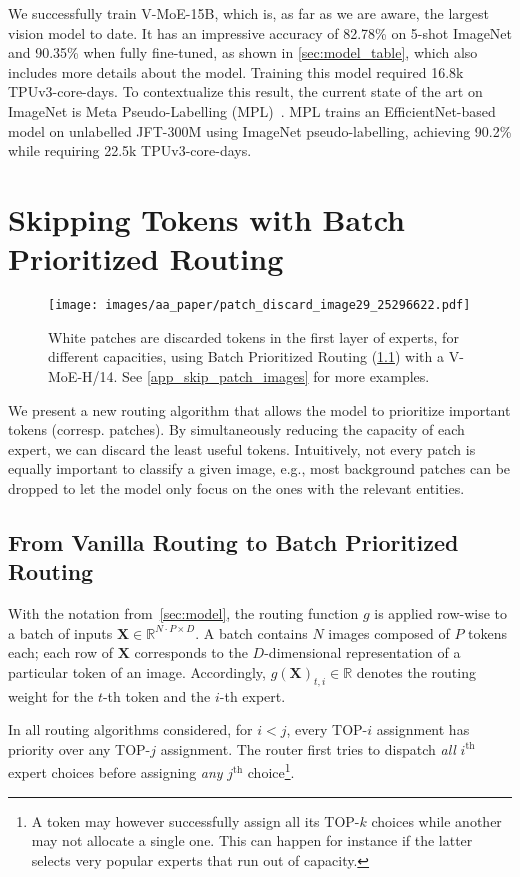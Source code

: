 \documentclass{article}
\newcommand{\abbv}{{V-MoE}}
\newcommand{\maxrouting}{Batch Prioritized Routing}
\begin{document}
We successfully train \abbv{}-15B, which is, as far as we are aware, the largest vision model to date. It has an impressive accuracy of 82.78\% on 5-shot ImageNet and 90.35\% when fully fine-tuned, as shown
in \cref{sec:model_table}, which also includes more details about the model.
Training this model required 16.8k TPUv3-core-days.
To contextualize this result, the current state of the art on ImageNet is Meta Pseudo-Labelling (MPL)~\cite{pham2020meta}.
MPL trains an EfficientNet-based model on unlabelled JFT-300M using ImageNet pseudo-labelling, achieving 90.2\% while requiring 22.5k TPUv3-core-days.
  \section{Skipping Tokens with Batch Prioritized Routing}
\label{sec:skip_patch}


\begin{figure}[tb]
\centering
\texttt{[image: images/aa\_paper/patch\_discard\_image29\_25296622.pdf]}
\caption{White patches are discarded tokens in the first layer of experts, for different capacities,
using \maxrouting{} (\cref{sec:max_routing}) with a \abbv{}-H/14. See \cref{app_skip_patch_images} for more examples.}
\label{im:patch_discard}
\end{figure}

We present a new routing algorithm that allows the model to prioritize important tokens (corresp. patches).
By simultaneously reducing the capacity of each expert, we can discard the least useful tokens. 
Intuitively, not every patch is equally important to classify a given image, e.g., most background patches can be dropped to let the model only focus on the ones with the relevant entities.


\subsection{From Vanilla Routing to \maxrouting{}}\label{sec:max_routing}
With the notation from~\cref{sec:model},
the routing function $g$ is applied row-wise to a batch of inputs $\mathbf{X} \in \mathbb{R}^{N\cdot P \times D}$.
A batch contains $N$ images composed of $P$ tokens each;
each row of $\mathbf{X}$ corresponds to the $D$-dimensional representation of a particular token of an image.
Accordingly, $g(\mathbf{X})_{t,i} \in \mathbb{R}$ denotes the routing weight for the $t$-th token and the $i$-th expert. 

In all routing algorithms considered, for $i < j$, every TOP-$i$ assignment has priority over any TOP-$j$ assignment. The router first tries to dispatch \textit{all} $i^\text{th}$ expert choices before assigning \textit{any} $j^\text{th}$ choice\footnote{A token may however successfully assign all its TOP-$k$ choices while another may not allocate a single one. This can happen for instance if the latter selects very popular experts that run out of capacity.}.
\end{document}
